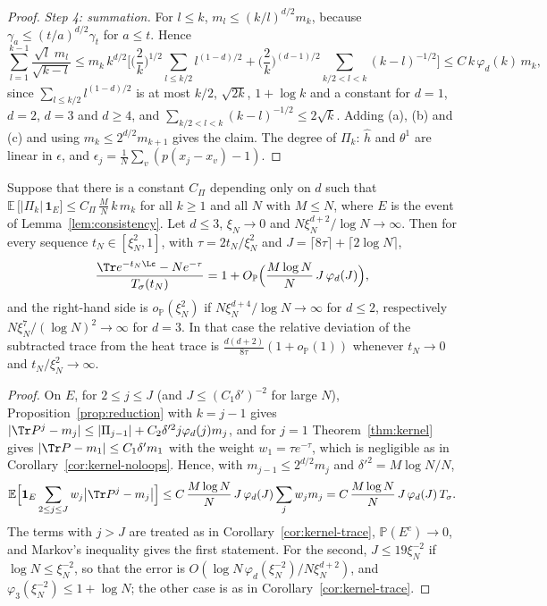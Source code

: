 \begin{proof}
\emph{Step 4: summation.} For $l\le k$, $m_l\le(k/l)^{d/2}m_k$, because $\gamma_a\le(t/a)^{d/2}\gamma_t$ for $a\le t$. Hence
\[
\sum_{l=1}^{k-1}\frac{\sqrt l\;m_l}{\sqrt{k-l}}\le m_k\,k^{d/2}\Big[\Big(\frac2k\Big)^{1/2}\sum_{l\le k/2}l^{(1-d)/2}+\Big(\frac2k\Big)^{(d-1)/2}\sum_{k/2<l<k}(k-l)^{-1/2}\Big]\le C\,k\,\varphi_d(k)\,m_k,
\]
since $\sum_{l\le k/2}l^{(1-d)/2}$ is at most $k/2$, $\sqrt{2k}$, $1+\log k$ and a constant for $d=1$, $d=2$, $d=3$ and $d\ge4$, and $\sum_{k/2<l<k}(k-l)^{-1/2}\le2\sqrt k$. Adding (a), (b) and (c) and using $m_k\le2^{d/2}m_{k+1}$ gives the claim. The degree of $\Pi_k$: $\hat h$ and $\theta^1$ are linear in $\epsilon$, and $\epsilon_j=\frac1N\sum_v(p(x_j-x_v)-1)$.
\end{proof}

\begin{corollary}\label{cor:secondstage}
Suppose that there is a constant $C_\Pi$ depending only on $d$ such that $\mathbb E\,\big[|\Pi_k|\,\mathbf 1_{E}\big]\le C_\Pi\,\frac MN\,k\,m_k$ for all $k\ge1$ and all $N$ with $M\le N$, where $E$ is the event of Lemma~\ref{lem:consistency}. Let $d\le3$, $\xi_N\to0$ and $N\xi_N^{d+2}/\log N\to\infty$. Then for every sequence $t_N\in[\xi_N^2,1]$, with $\tau=2t_N/\xi_N^2$ and $J=\lceil8\tau\rceil+\lceil2\log N\rceil$,
\[
\frac{\Tr e^{-t_N\Lc}-Ne^{-\tau}}{T_\sigma(t_N)}=1+O_{\mathbb P}\Big(\frac{M\log N}{N}\,J\,\varphi_d(J)\Big),
\]
and the right-hand side is $o_{\mathbb P}(\xi_N^2)$ if $N\xi_N^{d+4}/\log N\to\infty$ for $d\le2$, respectively $N\xi_N^{7}/(\log N)^2\to\infty$ for $d=3$. In that case the relative deviation of the subtracted trace from the heat trace is $\frac{d(d+2)}{8\tau}(1+o_{\mathbb P}(1))$ whenever $t_N\to0$ and $t_N/\xi_N^2\to\infty$.
\end{corollary}

\begin{proof}
On $E$, for $2\le j\le J$ (and $J\le(C_1\delta')^{-2}$ for large $N$), Proposition~\ref{prop:reduction} with $k=j-1$ gives $|\Tr P^j-m_j|\le|\Pi_{j-1}|+C_2\delta'^2j\varphi_d(j)m_j$, and for $j=1$ Theorem~\ref{thm:kernel} gives $|\Tr P-m_1|\le C_1\delta'm_1$ with the weight $w_1=\tau e^{-\tau}$, which is negligible as in Corollary~\ref{cor:kernel-noloops}. Hence, with $m_{j-1}\le2^{d/2}m_j$ and $\delta'^2=M\log N/N$,
\[
\mathbb E\Big[\mathbf 1_E\sum_{2\le j\le J}w_j\big|\Tr P^j-m_j\big|\Big]\le C\,\frac{M\log N}{N}\,J\,\varphi_d(J)\sum_jw_jm_j=C\,\frac{M\log N}{N}\,J\,\varphi_d(J)\,T_\sigma .
\]
The terms with $j>J$ are treated as in Corollary~\ref{cor:kernel-trace}, $\mathbb P(E^c)\to0$, and Markov's inequality gives the first statement. For the second, $J\le19\xi_N^{-2}$ if $\log N\le\xi_N^{-2}$, so that the error is $O(\log N\,\varphi_d(\xi_N^{-2})/N\xi_N^{d+2})$, and $\varphi_3(\xi_N^{-2})\le1+\log N$; the other case is as in Corollary~\ref{cor:kernel-trace}.
\end{proof}


